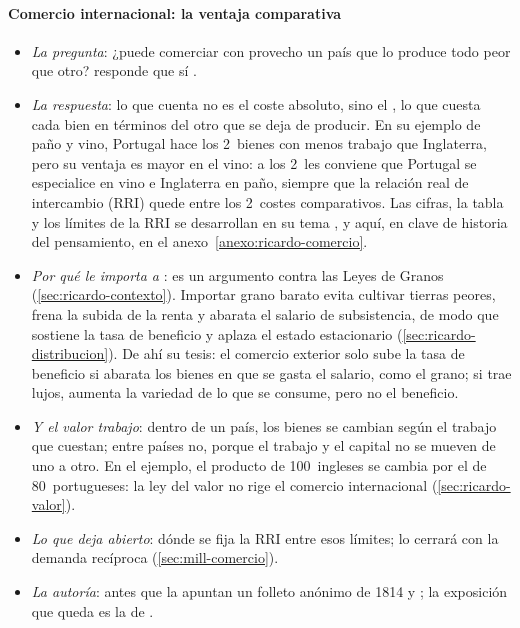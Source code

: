 \documentclass[11pt]{article}
\begin{document}
\paragraph{Comercio internacional: la ventaja comparativa}\label{sec:ricardo-comercio}
\begin{itemize}
\item \emph{La pregunta}: ¿puede comerciar con provecho un país que lo produce todo peor que otro?  responde que sí\nocite{Ricardo1821Principles} .
\item \emph{La respuesta}: lo que cuenta no es el coste absoluto, sino el , lo que cuesta cada bien en términos del otro que se deja de producir. En su ejemplo de paño y vino, Portugal hace los 2~bienes con menos trabajo que Inglaterra, pero su ventaja es mayor en el vino: a los 2~les conviene que Portugal se especialice en vino e Inglaterra en paño, siempre que la relación real de intercambio (RRI) quede entre los 2~costes comparativos. Las cifras, la tabla y los límites de la RRI se desarrollan en su tema , y aquí, en clave de historia del pensamiento, en el anexo~\ref{anexo:ricardo-comercio}.
\item \emph{Por qué le importa a }: es un argumento contra las Leyes de Granos (\ref{sec:ricardo-contexto}). Importar grano barato evita cultivar tierras peores, frena la subida de la renta y abarata el salario de subsistencia, de modo que sostiene la tasa de beneficio y aplaza el estado estacionario (\ref{sec:ricardo-distribucion}). De ahí su tesis: el comercio exterior solo sube la tasa de beneficio si abarata los bienes en que se gasta el salario, como el grano; si trae lujos, aumenta la variedad de lo que se consume, pero no el beneficio\nocite{Ricardo1821Principles}.
\item \emph{Y el valor trabajo}: dentro de un país, los bienes se cambian según el trabajo que cuestan; entre países no, porque el trabajo y el capital no se mueven de uno a otro. En el ejemplo, el producto de 100~ingleses se cambia por el de 80~portugueses: la ley del valor no rige el comercio internacional (\ref{sec:ricardo-valor}).
\item \emph{Lo que deja abierto}: dónde se fija la RRI entre esos límites; lo cerrará  con la demanda recíproca (\ref{sec:mill-comercio}).
\item \emph{La autoría}: antes que  la apuntan un folleto anónimo de 1814\nocite{GrancayGrancay2015Considerations} y \textcite{Torrens1815Essay}; la exposición que queda es la de \nocite{Ruffin2002Ricardo}.
\end{itemize}
\end{document}

